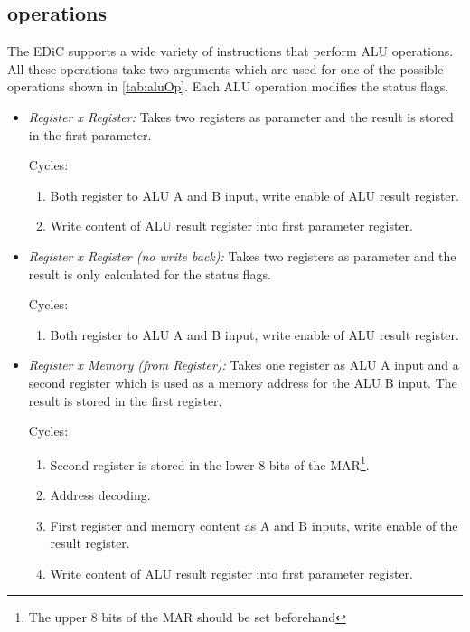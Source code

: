 \subsection{ operations}
The \gls{EDiC} supports a wide variety of instructions that perform \gls{ALU} operations.
All these operations take two arguments which are used for one of the possible operations shown in \cref{tab:aluOp}.
Each \gls{ALU} operation modifies the status flags.
\begin{itemize}
  \item \emph{Register x Register:} Takes two registers as parameter and the result is stored in the first parameter.

  Cycles:
  \begin{enumerate}
    \item Both register to \gls{ALU} A and B input, write enable of \gls{ALU} result register.
    \item Write content of \gls{ALU} result register into first parameter register.
  \end{enumerate}

  \item \emph{Register x Register (no write back):} Takes two registers as parameter and the result is only calculated for the status flags.

  Cycles:
  \begin{enumerate}
    \item Both register to \gls{ALU} A and B input, write enable of \gls{ALU} result register.
  \end{enumerate}

  \item \emph{Register x Memory (from Register):} Takes one register as \gls{ALU} A input and a second register which is used as a memory address for the \gls{ALU} B input.
  The result is stored in the first register.

  Cycles:
  \begin{enumerate}
    \item Second register is stored in the lower 8 bits of the \gls{MAR}\footnote{The upper 8 bits of the \gls{MAR} should be set beforehand}.
    \item Address decoding.
    \item First register and memory content as A and B inputs, write enable of the result register.
    \item Write content of \gls{ALU} result register into first parameter register.
  \end{enumerate}


\end{itemize}
